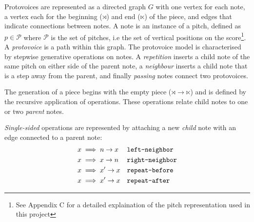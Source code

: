 \documentclass[12pt,a4paper,twoside,openright]{report} \usepackage[pdfborder={0 0 0}]{hyperref}    %
\theoremstyle{definition} \newtheorem{definition}{Definition}[section]
\begin{document}

Protovoices are represented as a directed graph $G$ with one vertex for each note, a vertex each for the beginning
($\rtimes$) and end ($\ltimes$) of the piece, and edges that indicate connections between notes. A note is an instance
of a pitch, defined as $p \in \mathcal{P}$ where $\mathcal{P}$ is the set of pitches, i.e the set of vertical positions
on the score\footnote{See Appendix C for a detailed explaination of the pitch representation used in this project}.
A \textit{protovoice} is a path within this graph. The protovoice model is characterised by stepwise generative
operations on notes. A \textit{repetition} inserts a child note of the same pitch on either side of the parent note,
a \textit{neighbour} inserts a child note that is a step away from the parent, and finally \textit{passing} notes
connect two protovoices.

The generation of a piece begins with the empty piece ($\rtimes \to \ltimes$) and is defined by the recursive
application of operations. These operations relate child notes to one or two \textit{parent} notes.


\textit{Single-sided} operations are represented by attaching a new \textit{child} note with an edge connected to
a parent note: \begin{equation}
  \begin{aligned} x &\implies n \to x && \text{\texttt{left-neighbor}} \label{eq:leftNeighbor} \\ x &\implies x \to n &&
  \text{\texttt{right-neighbor}} \label{eq:rightNeighbor} \\ x &\implies x' \to x && \text{\texttt{repeat-before}}
\label{eq:repeatBefore} \\ x &\implies x' \to x && \text{\texttt{repeat-after}} \label{eq:repeatAfter} \\ \end{aligned}
  \end{equation}
\end{document}
